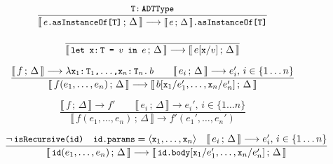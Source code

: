 \documentclass[a4paper,twoside]{article}
\newcommand{\lb}[2]{\llbracket\, #1\,;\, #2\, \rrbracket}
\newcommand{\TODO}[1]{\textcolor{YellowOrange}{(TODO: #1)}} %
\newcommand{\stt}[1]{\texttt{\small{#1}}}
\begin{document}
\begin{landscape}
\begin{figure}[htb]\ContinuedFloat
\centering
\begin{framed}

\begin{equation}
\dfrac{
  \stt{T:\,ADTType}
}{
  \lb{\stt{$e$.asInstanceOf[T]}}{\Delta} \longrightarrow \stt{$\lb{e}{\Delta}$.asInstanceOf[T]}
}
\end{equation}

\begin{equation}
\dfrac{
}{
  \lb{\stt{let x:\,T = $v$ in $e$}}{\Delta} \longrightarrow
  \lb{e[\stt{x}/\stt{$v$}]}{\Delta}
}
\end{equation}


\begin{equation}
\dfrac{
  \lb{f}{\Delta} \longrightarrow \lambda \stt{x$_1$:\,T$_1$,\ldots,x$_n$:\,T$_n$.\,$b$}
  \qquad
  \lb{e_i}{\Delta} \longrightarrow e_i',\, i \in \{1 \ldots n\}
}{
  \lb{f(e_1,\ldots,e_n)}{\Delta} \longrightarrow
  \lb{b[\stt{x}_1/e_1',\ldots,\stt{x}_n/e_n']}{\Delta}
}
\end{equation}

\begin{equation}
\dfrac{
  \lb{f}{\Delta} \longrightarrow f' \qquad
  \lb{e_i}{\Delta} \longrightarrow e_i',\, i \in \{1 \ldots n\}
}{
  \lb{f(e_1,\ldots,e_n)}{\Delta} \longrightarrow
  f'(e_1', \ldots, e_n')
}
\end{equation}


\begin{equation}
\dfrac{
 \neg\,\stt{isRecursive(id)} \quad
 \stt{id.params} = \langle \stt{x}_1, \ldots, \stt{x}_n \rangle \quad
 \lb{e_i}{\Delta} \longrightarrow e_i',\, i \in \{1 \ldots n\}
}{
  \lb{\stt{id}(e_1,\ldots,e_n)}{\Delta} \longrightarrow
  \lb{\stt{id.body}[\stt{x}_1/e_1',\ldots,\stt{x}_n/e_n']}{\Delta}
}
\label{fig:symbolicsem:fi1}
\end{equation}


\end{framed}
\end{figure}
\end{landscape}
\end{document}
